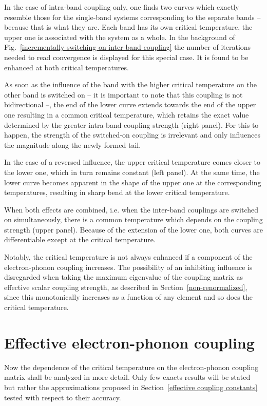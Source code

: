 In the case of intra-band coupling only, one finds two curves which exactly
resemble those for the single-band systems corresponding to the separate bands
-- because that is what they are. Each band has its own critical temperature,
the upper one is associated with the system as a whole. In the background of
Fig.~\ref{incrementally switching on inter-band coupling} the number of
iterations needed to read convergence is displayed for this special case. It is
found to be enhanced at both critical temperatures.

As soon as the influence of the band with the higher critical temperature on the
other band is switched on -- it is important to note that this coupling is not
bidirectional --, the end of the lower curve extends towards the end of the
upper one resulting in a common critical temperature, which retains the exact
value determined by the greater intra-band coupling strength (right panel). For
this to happen, the strength of the switched-on coupling is irrelevant and only
influences the magnitude along the newly formed tail.

In the case of a reversed influence, the upper critical temperature comes closer
to the lower one, which in turn remains constant (left panel). At the same time,
the lower curve becomes apparent in the shape of the upper one at the
corresponding temperatures, resulting in sharp bend at the lower critical
temperature.

When both effects are combined, i.e. when the inter-band couplings are switched
on simultaneously, there is a common temperature which depends on the coupling
strength (upper panel). Because of the extension of the lower one, both curves
are differentiable except at the critical temperature.

Notably, the critical temperature is not always enhanced if a component of the
electron-phonon coupling increases. The possibility of an inhibiting influence
is disregarded when taking the maximum eigenvalue of the coupling matrix as
effective scalar coupling strength, as described in
Section~\ref{non-renormalized}, since this monotonically increases as a function
of any element and so does the critical temperature.

\section{Effective electron-phonon coupling}

Now the dependence of the critical temperature on the electron-phonon coupling
matrix shall be analyzed in more detail. Only few exacts results will be stated
but rather the approximations proposed in Section~\ref{effective coupling
constants} tested with respect to their accuracy.

